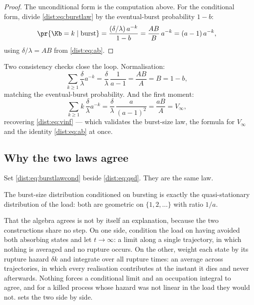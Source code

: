 \begin{proof}
The unconditional form is the computation above. For the conditional form,
divide \cref{dist:eq:burstlaw} by the eventual-burst probability $1-b$:
\[
\pr{\Kb=k\mid\text{burst}}
=\frac{(\delta/\lambda)\,a^{-k}}{1-b}
=\frac{AB}{B}\,a^{-k}
=(a-1)\,a^{-k},
\]
using $\delta/\lambda=AB$ from \cref{dist:eq:ab}.
\end{proof}

Two consistency checks close the loop. Normalisation:
\[
\sum_{k\ge1}\frac{\delta}{\lambda}a^{-k}
=\frac{\delta}{\lambda}\,\frac{1}{a-1}
=\frac{AB}{A}=B=1-b,
\]
matching the eventual-burst probability. And the first moment:
\[
\sum_{k\ge1}k\,\frac{\delta}{\lambda}a^{-k}
=\frac{\delta}{\lambda}\,\frac{a}{(a-1)^2}
=\frac{aB}{A}=V_\infty,
\]
recovering \cref{dist:eq:vinf} --- which validates the burst-size law, the
formula for $V_\infty$ and the identity \cref{dist:eq:ab} at once.

\subsection{Why the two laws agree}
\label{dist:sec:identity}

Set \cref{dist:eq:burstlawcond} beside \cref{dist:eq:qsd}. They are the same
law.

\begin{theorem}
\label{dist:thm:identity}
The burst-size distribution conditioned on bursting is exactly the
quasi-stationary distribution of the load: both are geometric on
$\{1,2,\ldots\}$ with ratio $1/a$.
\end{theorem}

That the algebra agrees is not by itself an explanation, because the two
constructions share no step. On one side, condition the load on having avoided
both absorbing states and let $t\to\infty$: a limit along a single trajectory,
in which nothing is averaged and no rupture occurs. On the other, weight each
state by its rupture hazard $\delta k$ and integrate over all rupture times:
an average across trajectories, in which every realisation contributes at the
instant it dies and never afterwards. Nothing forces a conditional limit and
an occupation integral to agree, and for a killed process whose hazard was not
linear in the load they would not.
 sets the two side by side.

